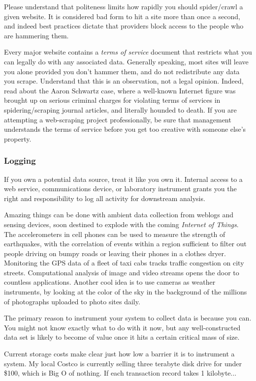 \documentclass[10pt]{article}
\begin{document}
Please understand that politeness limits how rapidly you should spider/crawl a given website. It is considered bad form to hit a site more than once a second, and indeed best practices dictate that providers block access to the people who are hammering them.

Every major website contains a \textit{terms of service} document that restricts what you can legally do with any associated data. Generally speaking, most sites will leave you alone provided you don’t hammer them, and do not redistribute any data you scrape. Understand that this is an observation, not a legal opinion. Indeed, read about the Aaron Schwartz case, where a well-known Internet figure was brought up on serious criminal charges for violating terms of services in spidering/scraping journal articles, and literally hounded to death. If you are attempting a web-scraping project professionally, be sure that management understands the terms of service before you get too creative with someone else’s property.

\subsubsection{Logging}
If you own a potential data source, treat it like you own it. Internal access to a web service, communications device, or laboratory instrument grants you the right and responsibility to log all activity for downstream analysis.

Amazing things can be done with ambient data collection from weblogs and sensing devices, soon destined to explode with the coming \textit{Internet of Things}. The accelerometers in cell phones can be used to measure the strength of earthquakes, with the correlation of events within a region sufficient to filter out people driving on bumpy roads or leaving their phones in a clothes dryer. Monitoring the GPS data of a fleet of taxi cabs tracks traffic congestion on city streets. Computational analysis of image and video streams opens the door to countless applications. Another cool idea is to use cameras as weather instruments, by looking at the color of the sky in the background of the millions of photographs uploaded to photo sites daily.

The primary reason to instrument your system to collect data is because you can. You might not know exactly what to do with it now, but any well-constructed data set is likely to become of value once it hits a certain critical mass of size.

Current storage costs make clear just how low a barrier it is to instrument a system. My local Costco is currently selling three terabyte disk drive for under \$100, which is Big O of nothing. If each transaction record takes 1 kilobyte...
\end{document}
